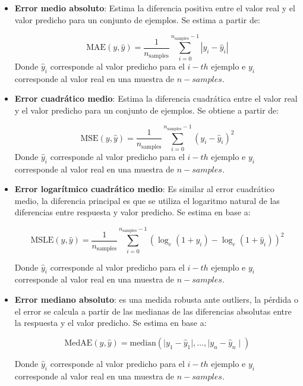 \begin{itemize}
	\item \textbf{Error medio absoluto}: Estima la diferencia positiva entre el valor real y el valor predicho para un conjunto de ejemplos. Se estima a partir de: 
	
	\begin{equation}
		\text{MAE}(y, \hat{y}) = \frac{1}{n_{\text{samples}}} \sum_{i=0}^{n_{\text{samples}}-1} \left| y_i - \hat{y}_i \right|
	\end{equation}
	Donde $\hat{y}_i$ corresponde al valor predicho para el $i-th$ ejemplo e $y_{i}$ corresponde al valor real en una muestra de $n-samples$.
		
	\item \textbf{Error cuadrático medio}: Estima la diferencia cuadrática entre el valor real y el valor predicho para un conjunto de ejemplos. Se obtiene a partir de:
	
	\begin{equation}
		\text{MSE}(y, \hat{y}) = \frac{1}{n_\text{samples}} \sum_{i=0}^{n_\text{samples} - 1} (y_i - \hat{y}_i)^2
	\end{equation}
	Donde $\hat{y}_i$ corresponde al valor predicho para el $i-th$ ejemplo e $y_{i}$ corresponde al valor real en una muestra de $n-samples$.
		
	\item \textbf{Error logarítmico cuadrático medio}: Es similar al error cuadrático medio, la diferencia principal es que se utiliza el logaritmo natural de las diferencias entre respuesta y valor predicho. Se estima en base a: 
	
	\begin{equation}
		\text{MSLE}(y, \hat{y}) = \frac{1}{n_\text{samples}} \sum_{i=0}^{n_\text{samples} - 1} (\log_e (1 + y_i) - \log_e (1 + \hat{y}_i) )^2
	\end{equation}
	
	Donde $\hat{y}_i$ corresponde al valor predicho para el $i-th$ ejemplo e $y_{i}$ corresponde al valor real en una muestra de $n-samples$.
		
	\item \textbf{Error mediano absoluto}: es una medida robusta ante outliers, la pérdida o el error se calcula a partir de las medianas de las diferencias absolutas entre la respuesta y el valor predicho. Se estima en base a: 
	
	\begin{equation}
		\text{MedAE}(y, \hat{y}) = \text{median}(\mid y_1 - \hat{y}_1 \mid, \ldots, \mid y_n - \hat{y}_n \mid)
	\end{equation}
	
	Donde $\hat{y}_i$ corresponde al valor predicho para el $i-th$ ejemplo e $y_{i}$ corresponde al valor real en una muestra de $n-samples$.
		
		
\end{itemize}

